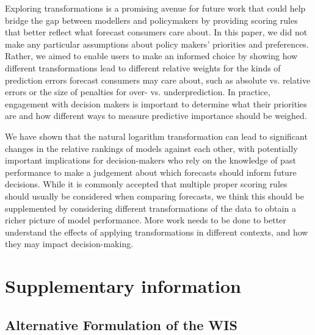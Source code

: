 \documentclass{article}
\begin{document}
Exploring transformations is a promising avenue for future work that could help bridge the gap between modellers and policymakers by providing scoring rules that better reflect what forecast consumers care about. In this paper, we did not make any particular assumptions about policy makers' priorities and preferences. Rather, we aimed to enable users to make an informed choice by showing how different transformations lead to different relative weights for the kinds of prediction errors forecast consumers may care about, such as absolute vs. relative errors or the size of penalties for over- vs. underprediction. In practice, engagement with decision makers is important to determine what their priorities are and how different ways to measure predictive importance should be weighed.  

We have shown that the natural logarithm transformation can lead to significant changes in the relative rankings of models against each other, with potentially important implications for decision-makers who rely on the knowledge of past performance to make a judgement about which forecasts should inform future decisions. While it is commonly accepted that multiple proper scoring rules should usually be considered when comparing forecasts, we think this should be supplemented by considering different transformations of the data to obtain a richer picture of model performance. More work needs to be done to better understand the effects of applying transformations in different contexts, and how they may impact decision-making. 

\newpage

\appendix
\section{Supplementary information}

\renewcommand{\thefigure}{SI.\arabic{figure}}
\setcounter{figure}{0}
\renewcommand{\thetable}{SI.\arabic{table}} \setcounter{table}{0}

\subsection{Alternative Formulation of the WIS}
\label{sec:alternative-wis}
\end{document}
